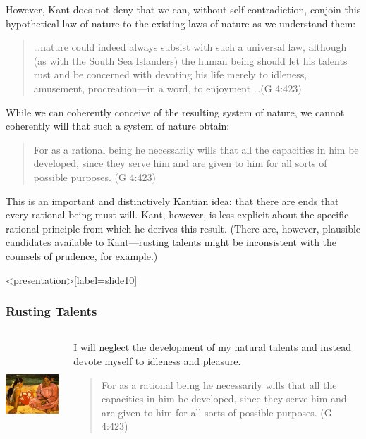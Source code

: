However, Kant does not deny that we can, without self-contradiction, conjoin this hypothetical law of nature to the existing laws of nature as we understand them:

\begin{quote}
	\ldots nature could indeed always subsist with such a universal law, although (as with the South Sea Islanders) the human being should let his talents rust and be concerned with devoting his life merely to idleness, amusement, procreation---in a word, to enjoyment \ldots (G 4:423)
\end{quote}

While we can coherently conceive of the resulting system of nature, we cannot coherently will that such a system of nature obtain:

\begin{quote}
	For as a rational being he necessarily wills that all the capacities in him be developed, since they serve him and are given to him for all sorts of possible purposes. (G 4:423)
\end{quote}

This is an important and distinctively Kantian idea: that there are ends that every rational being must will. Kant, however, is less explicit about the specific rational principle from which he derives this result. (There are, however, plausible candidates available to Kant---rusting talents might be inconsistent with the counsels of prudence, for example.) \change

\begin{frame}<presentation>[label=slide10]
    \frametitle{Rusting Talents}
        \begin{columns}
            \begin{column}{5cm}
                \includegraphics[height=4cm]{../../graphics/rusting_talents.jpg}
            \end{column}
            \begin{column}{5cm}
                I will neglect the development of my natural talents and instead devote myself to idleness and pleasure.
                \begin{quote}
                    For as a rational being he necessarily wills that all the capacities in him be developed, since they serve him and are given to him for all sorts of possible purposes. (G 4:423)
                \end{quote}
            \end{column}
        \end{columns}
\end{frame}

